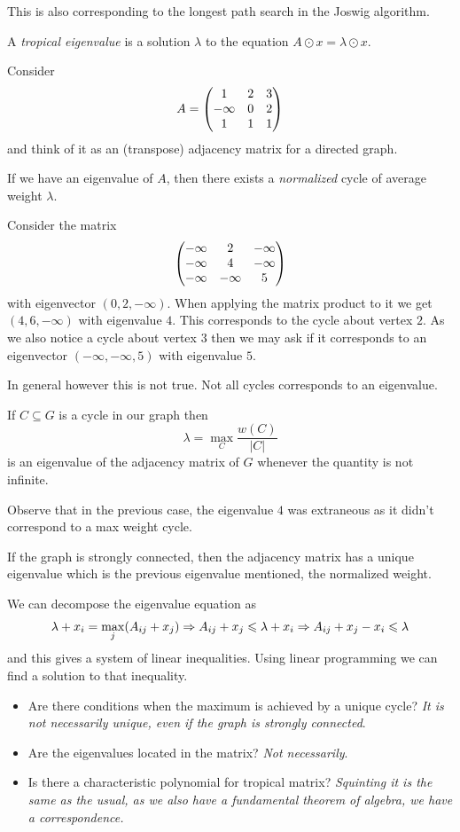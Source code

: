 \documentclass[12pt]{memoir}
\theoremstyle{definition}
\def\la{\lambda}
\begin{document}
\begin{Rmk}
This is also corresponding to the longest path search in the Joswig algorithm.
\end{Rmk}

\begin{Def}
    A \emph{tropical eigenvalue} is a solution $\la$ to the equation $A\odot x=\la\odot x$.
\end{Def}

\begin{Ex}
    Consider 
    $$A=\begin{pmatrix} 1 & 2 & 3 \\ -\infty & 0 & 2 \\ 1 & 1 & 1 \end{pmatrix}$$
    and think of it as an (transpose) adjacency matrix for a directed graph. 
\end{Ex}

\begin{Lem}
If we have an eigenvalue of $A$, then there exists a \emph{normalized} cycle of average weight $\la$.
\end{Lem}

\begin{Ex}
    Consider the matrix 
    $$\begin{pmatrix} -\infty & 2 & -\infty \\ -\infty & 4 & -\infty \\ -\infty & -\infty & 5 \end{pmatrix}$$
    with eigenvector $(0,2,-\infty)$. When applying the matrix product to it we get $(4,6,-\infty)$ with eigenvalue $4$. This corresponds to the cycle about vertex $2$. As we also notice a cycle about vertex $3$ then we may ask if it corresponds to an eigenvector $(-\infty,-\infty,5)$ with eigenvalue $5$.
\end{Ex}

In general however this is not true. Not all cycles corresponds to an eigenvalue.

\begin{Lem}
    If $C\subseteq G$ is a cycle in our graph then 
    $$\la=\max_{C}\frac{w(C)}{|C|}$$
    is an eigenvalue of the adjacency matrix of $G$ whenever the quantity is not infinite.
\end{Lem}

Observe that in the previous case, the eigenvalue $4$ was extraneous as it didn't correspond to a max weight cycle.

\begin{Th}
If the graph is strongly connected, then the adjacency matrix has a unique eigenvalue which is the previous eigenvalue mentioned, the normalized weight.
\end{Th}

We can decompose the eigenvalue equation as 
$$\la+x_i=\max_j(A_{ij}+x_j)\To A_{ij}+x_j\leq\la+x_i\To A_{ij}+x_j-x_i\leq\la$$
and this gives a system of linear inequalities. Using linear programming we can find a solution to that inequality.
\begin{itemize}
    \item Are there conditions when the maximum is achieved by a unique cycle? \emph{It is not necessarily unique, even if the graph is strongly connected}.
    \item Are the eigenvalues located in the matrix? \emph{Not necessarily}.
    \item Is there a characteristic polynomial for tropical matrix? \emph{Squinting it is the same as the usual, as we also have a fundamental theorem of algebra, we have a correspondence.}
\end{itemize}
\end{document}
